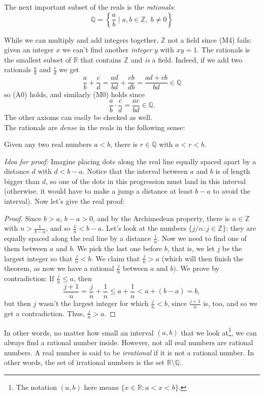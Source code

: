 \documentclass[11pt,dvipsnames]{book}
\numberwithin{figure}{section} %
\numberwithin{table}{section} %
\begin{document}
The next important subset of the reals is the {\it rationals}:
\[
\mathbb{Q} = \left\{\frac{a}{b} \;|\; a,b\in \mathbb{Z},\; b\neq 0\right\}
\]

While we can multiply and add integers together, $\mathbb{Z}$ not a field since (M4) fails: given an integer $x$ we can't find another {\it integer} $y$ with $xy=1$. The rationals is the smallest subset of $\mathbb{R}$ that contains $\mathbb{Z}$ and {\it is} a field. Indeed, if we add two rationals $\frac{a}{b}$ and $\frac{c}{d}$  we get
\[
\frac{a}{b}+\frac{c}{d} = \frac{ad}{bd}+\frac{cb}{db} = \frac{ad+cb}{bd}\in\mathbb{Q}
\]
so (A0) holds, and similarly (M0) holds since
\[
\frac{a}{b}\cdot \frac{c}{d}=\frac{ac}{bd}\in\mathbb{Q}.
\]
The other axioms can easily be checked as well.\\

The rationals are {\it dense} in the reals in the following sense:

\begin{theorem}
Given any two real numbers $a<b$, there is $r\in\mathbb{Q}$ with $a<r<b$.
\end{theorem}

{\it Idea for proof:} Imagine placing dots along the real line equally spaced apart by a distance $d$ with $d<b-a$. Notice that the interval between $a$ and $b$ is of length bigger than $d$, so one of the dots in this progression must land in this interval (otherwise, it would have to make a jump a distance at least $b-a$ to avoid the interval). Now let's give the real proof:

\begin{proof}
Since $b>a$, $b-a>0$, and by the Archimedean property, there is $n\in  \mathbb{Z}$ with $n>\frac{1}{b-a}$, and so $\frac{1}{n}<b-a$. Let's look at the numbers $\{j/n:j\in\mathbb{Z}\}$: they are equally spaced along the real line by a distance $\frac{1}{n}$. Now we need to find one of them between $a$ and $b$. We pick the last one before $b$, that is, we let $j$ be the largest integer so that $\frac{j}{n}<b$. We claim that $\frac{j}{n}>a$ (which will then finish the theorem, as now we have a rational $\frac{j}{n}$ between $a$ and $b)$. We prove by contradiction: If $\frac{j}{n}\leq a$, then
\[
\frac{j+1}{n}=\frac{j}{n}+\frac{1}{n}\leq a+\frac{1}{n}<a+(b-a)=b,
\]
but then $j$ wasn't the largest integer for which $\frac{j}{n}<b$, since $\frac{j+1}{n}$ is, too, and so we get a contradiction. Thus, $\frac{j}{n}>a$.
\end{proof}

In other words, no matter how small an interval $(a,b)$ that we look at\footnote{The notation $(a,b)$ here means $\{ x \in \mathbb{R} :  a < x < b\}$.}, we can always find a rational number inside. However, not all real numbers are rational numbers. A real number is said to be {\it irrational} if it is not a rational number. In other words, the set of irrational numbers is the set $\mathbb{R} \setminus \mathbb{Q}$.
\end{document}
